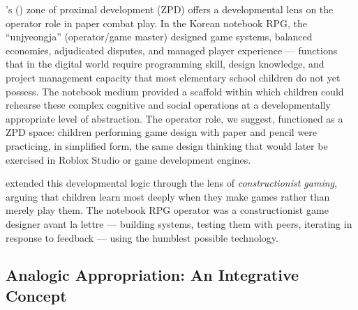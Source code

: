 \documentclass[12pt]{article}
\begin{document}
\citeauthor{vygotsky1978}'s (\citeyear{vygotsky1978}) zone of proximal development (ZPD) offers a developmental lens on the operator role in paper combat play. In the Korean notebook RPG, the ``unjyeongja'' (operator/game master) designed game systems, balanced economies, adjudicated disputes, and managed player experience --- functions that in the digital world require programming skill, design knowledge, and project management capacity that most elementary school children do not yet possess. The notebook medium provided a scaffold within which children could rehearse these complex cognitive and social operations at a developmentally appropriate level of abstraction. The operator role, we suggest, functioned as a ZPD space: children performing game design with paper and pencil were practicing, in simplified form, the same design thinking that would later be exercised in Roblox Studio or game development engines.

\citet{kafai2016} extended this developmental logic through the lens of \emph{constructionist gaming}, arguing that children learn most deeply when they make games rather than merely play them. The notebook RPG operator was a constructionist game designer avant la lettre --- building systems, testing them with peers, iterating in response to feedback --- using the humblest possible technology.

\subsection{Analogic Appropriation: An Integrative Concept}
\end{document}
